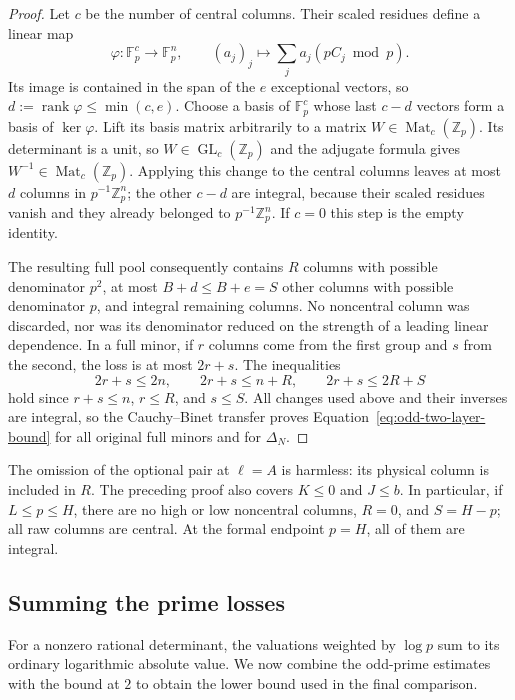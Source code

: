 \begin{proof}
Let $c$ be the number of central columns.  Their scaled residues
define a linear map
\[
 \varphi:\mathbb F_p^c\longrightarrow\mathbb F_p^n,
 \qquad (a_j)_j\longmapsto\sum_j a_j(pC_j\bmod p).
\]
Its image is contained in the span of the $e$ exceptional vectors,
so $d:=\operatorname{rank}\varphi\le\min(c,e)$.  Choose a basis of
$\mathbb F_p^c$ whose last $c-d$ vectors form a basis of
$\ker\varphi$.  Lift its basis matrix arbitrarily to a matrix
$W\in\operatorname{Mat}_{c}(\mathbb Z_p)$.  Its determinant is a
unit, so $W\in\operatorname{GL}_c(\mathbb Z_p)$ and the adjugate
formula gives $W^{-1}\in\operatorname{Mat}_{c}(\mathbb Z_p)$.
Applying this change to the central columns leaves at most $d$
columns in $p^{-1}\mathbb Z_p^n$; the other $c-d$ are integral,
because their scaled residues vanish and they already belonged to
$p^{-1}\mathbb Z_p^n$.  If $c=0$ this step is the empty identity.

The resulting full pool consequently contains $R$ columns with
possible denominator $p^2$, at most $B+d\le B+e=S$ other columns
with possible denominator $p$, and integral remaining columns.
No noncentral column was discarded, nor was its denominator reduced
on the strength of a leading linear dependence.  In a full minor,
if $r$ columns come from the first group and $s$ from the second,
the loss is at most $2r+s$.  The inequalities
\[
 2r+s\le2n,\qquad 2r+s\le n+R,\qquad 2r+s\le2R+S
\]
hold since $r+s\le n$, $r\le R$, and $s\le S$.  All changes used
above and their inverses are integral, so the Cauchy--Binet transfer
proves Equation~\eqref{eq:odd-two-layer-bound} for all original full
minors and for $\Delta_N$.
\end{proof}

The omission of the optional pair at $\ell=A$ is harmless: its
physical column is included in $R$.  The preceding proof also covers
$K\le0$ and $J\le b$.  In particular, if $L\le p\le H$, there
are no high or low noncentral columns, $R=0$, and $S=H-p$; all raw
columns are central.  At the formal endpoint $p=H$, all of them are
integral.

\subsection{Summing the prime losses}

For a nonzero rational determinant, the valuations weighted by
$\log p$ sum to its ordinary logarithmic absolute value.  We now
combine the odd-prime estimates with the bound at $2$ to obtain the
lower bound used in the final comparison.

